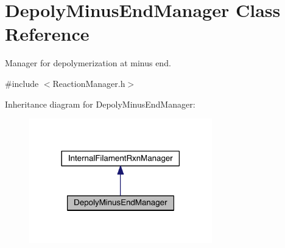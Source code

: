 \hypertarget{classDepolyMinusEndManager}{\section{Depoly\+Minus\+End\+Manager Class Reference}
\label{classDepolyMinusEndManager}
}


Manager for depolymerization at minus end.  




{\ttfamily \#include $<$Reaction\+Manager.\+h$>$}



Inheritance diagram for Depoly\+Minus\+End\+Manager\+:
\nopagebreak
\begin{figure}[H]
\begin{center}
\leavevmode
\includegraphics[width=225pt]{classDepolyMinusEndManager__inherit__graph}
\end{center}
\end{figure}


